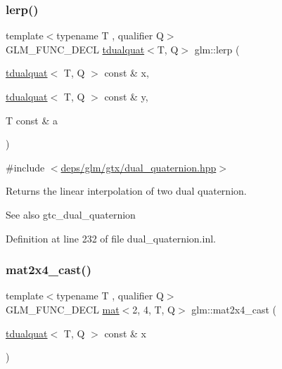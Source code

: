 \subsubsection{\texorpdfstring{lerp()}{lerp()}}
{\footnotesize\ttfamily template$<$typename T , qualifier Q$>$ \\
G\+L\+M\+\_\+\+F\+U\+N\+C\+\_\+\+D\+E\+CL \hyperlink{structglm_1_1tdualquat}{tdualquat}$<$T, Q$>$ glm\+::lerp (\begin{DoxyParamCaption}\item[{\hyperlink{structglm_1_1tdualquat}{tdualquat}$<$ T, Q $>$ const \&}]{x,  }\item[{\hyperlink{structglm_1_1tdualquat}{tdualquat}$<$ T, Q $>$ const \&}]{y,  }\item[{T const \&}]{a }\end{DoxyParamCaption})}



{\ttfamily \#include $<$\hyperlink{dual__quaternion_8hpp}{deps/glm/gtx/dual\+\_\+quaternion.\+hpp}$>$}

Returns the linear interpolation of two dual quaternion.

\begin{DoxySeeAlso}{See also}
gtc\+\_\+dual\+\_\+quaternion 
\end{DoxySeeAlso}


Definition at line 232 of file dual\+\_\+quaternion.\+inl.

\mbox{\label{group__gtx__dual__quaternion_gae99d143b37f9cad4cd9285571aab685a}} 
\subsubsection{\texorpdfstring{mat2x4\+\_\+cast()}{mat2x4\_cast()}}
{\footnotesize\ttfamily template$<$typename T , qualifier Q$>$ \\
G\+L\+M\+\_\+\+F\+U\+N\+C\+\_\+\+D\+E\+CL \hyperlink{structglm_1_1mat}{mat}$<$2, 4, T, Q$>$ glm\+::mat2x4\+\_\+cast (\begin{DoxyParamCaption}\item[{\hyperlink{structglm_1_1tdualquat}{tdualquat}$<$ T, Q $>$ const \&}]{x }\end{DoxyParamCaption})}



